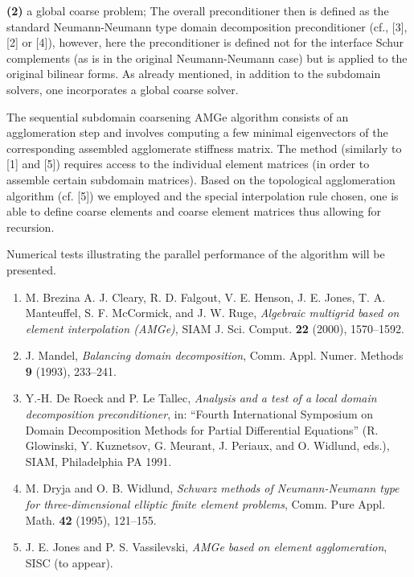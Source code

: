 \documentclass[11pt]{article}
\begin{document}
{\bf (2)}   a global coarse problem;
The overall preconditioner then is defined as the standard
Neumann-Neumann type domain decomposition preconditioner
(cf., [3], [2] or [4]), however, here the preconditioner is
defined not for the interface Schur complements (as is in
the original Neumann-Neumann case) but is applied to the
original bilinear forms. As already mentioned, in addition
to the subdomain solvers, one incorporates a global coarse
solver.


The sequential subdomain coarsening AMGe algorithm consists
of an agglomeration step and involves computing a few
minimal eigenvectors of the corresponding assembled
agglomerate stiffness matrix. The method (similarly to [1]
and [5]) requires access to the individual element matrices
(in order to assemble certain subdomain matrices). Based on
the topological agglomeration algorithm (cf. [5]) we
employed and the special interpolation rule chosen, one is
able to define coarse elements and coarse element matrices
thus allowing for recursion.


Numerical tests illustrating the parallel performance of
the algorithm will be presented.



\begin{enumerate}


\item M. Brezina A. J. Cleary, R. D. Falgout, V. E. Henson,
J.  E. Jones, T. A. Manteuffel, S. F. McCormick, and J. W. Ruge,
{\em Algebraic multigrid based on element interpolation (AMGe)},
SIAM J. Sci. Comput. {\bf 22} (2000), 1570--1592.

\item J. Mandel,
{\em Balancing domain decomposition},
Comm. Appl. Numer. Methods {\bf 9} (1993), 233--241.

\item Y.-H. De Roeck and P. Le Tallec,
{\em Analysis and a test of a local domain decomposition
preconditioner}, in: ``Fourth International Symposium on
Domain Decomposition Methods for Partial Differential
Equations'' (R. Glowinski, Y. Kuznetsov, G. Meurant, J.
Periaux, and O. Widlund, eds.),
SIAM, Philadelphia PA 1991.

\item M. Dryja and O. B. Widlund,
{\em Schwarz methods of Neumann-Neumann type for
three-dimensional elliptic finite element problems},
Comm. Pure Appl. Math. {\bf 42} (1995), 121--155.

\item J. E. Jones and P. S. Vassilevski,
{\em AMGe based on element agglomeration},
SISC (to appear).


\end{enumerate}
\end{document}

